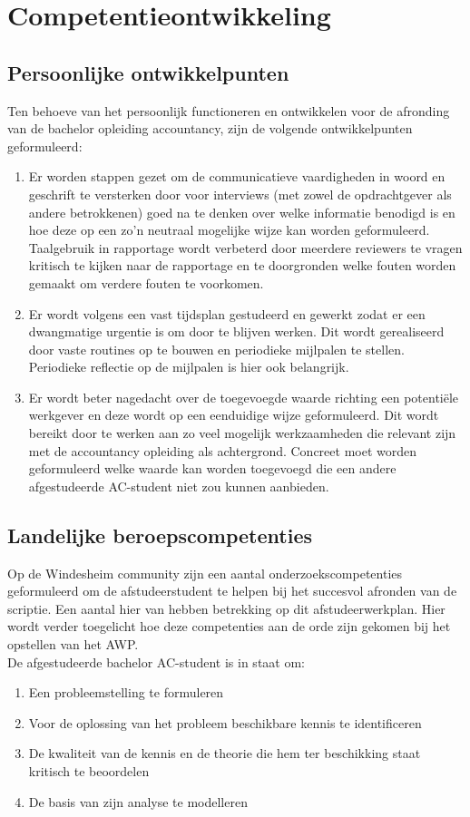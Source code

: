 \chapter{Competentieontwikkeling}
\section{Persoonlijke ontwikkelpunten}
Ten behoeve van het persoonlijk functioneren en ontwikkelen voor de afronding van de bachelor opleiding accountancy, zijn de volgende ontwikkelpunten geformuleerd:
\begin{enumerate}
    \item Er worden stappen gezet om de communicatieve vaardigheden in woord en geschrift te versterken door voor interviews (met zowel de opdrachtgever als andere betrokkenen) goed na te denken over welke informatie benodigd is en hoe deze op een zo'n neutraal mogelijke wijze kan worden geformuleerd. Taalgebruik in rapportage wordt verbeterd door meerdere reviewers te vragen kritisch te kijken naar de rapportage en te doorgronden welke fouten worden gemaakt om verdere fouten te voorkomen. 
    \item Er wordt volgens een vast tijdsplan gestudeerd en gewerkt zodat er een dwangmatige urgentie is om door te blijven werken. Dit wordt gerealiseerd door vaste routines op te bouwen en periodieke mijlpalen te stellen. Periodieke reflectie op de mijlpalen is hier ook belangrijk.
    \item Er wordt beter nagedacht over de toegevoegde waarde richting een potentiële werkgever en deze wordt op een eenduidige wijze geformuleerd. Dit wordt bereikt door te werken aan zo veel mogelijk werkzaamheden die relevant zijn met de accountancy opleiding als achtergrond. Concreet moet worden geformuleerd welke waarde kan worden toegevoegd die een andere afgestudeerde AC-student niet zou kunnen aanbieden.
\end{enumerate}

\newpage
\section{Landelijke beroepscompetenties}
Op de Windesheim community zijn een aantal onderzoekscompetenties geformuleerd om de afstudeerstudent te helpen bij het succesvol afronden van de scriptie. Een aantal hier van hebben betrekking op dit afstudeerwerkplan. Hier wordt verder toegelicht hoe deze competenties aan de orde zijn gekomen bij het opstellen van het AWP. \\
De afgestudeerde bachelor AC-student is in staat om: 
\begin{enumerate}
    \item Een probleemstelling te formuleren
    \item Voor de oplossing van het probleem beschikbare kennis te identificeren
    \item De kwaliteit van de kennis en de theorie die hem ter beschikking staat kritisch te beoordelen
    \item De basis van zijn analyse te modelleren
\end{enumerate}

